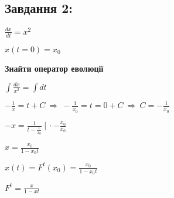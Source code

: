 \subsection{Завдання 2:}

$\frac{dx}{dt} = x^2$

$x(t=0) = x_0$

\textbf{Знайти оператор еволюції}

$\int \frac{dx}{x^2} = \int dt$

$-\frac{1}{x} = t + C\ \Longrightarrow \ -\frac{1}{x_0} = t = 0 + C \ \Longrightarrow\ C = -\frac{1}{x_0}$

$-x = \frac{1}{t - \frac{1}{x_0}}\ | \ \cdot -\frac{x_0}{x_0}$

$x = \frac{x_0}{1-x_0t}$

$x(t) = F^t (x_0) = \frac{x_0}{1-x_0t}$

$F^t  =  \frac{x}{1-xt}$

